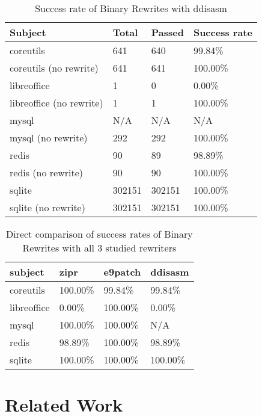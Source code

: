 \documentclass[a4paper,11pt,oneside]{report}
\begin{document}
    \begin{table}[h]
    \centering
    \caption{Success rate of Binary Rewrites with ddisasm}
    \begin{tabular}{|l|l|l|l|}
    \hline
    Subject & Total & Passed & Success rate \\ \hline
    coreutils & 641 & 640 & 99.84\% \\ \hline
    coreutils (no rewrite) & 641 & 641 & 100.00\% \\ \hline
    libreoffice & 1 & 0 & 0.00\% \\ \hline
    libreoffice (no rewrite) & 1 & 1 & 100.00\% \\ \hline
    mysql & N/A & N/A & N/A \\ \hline
    mysql (no rewrite) & 292 & 292 & 100.00\% \\ \hline
    redis & 90 & 89 & 98.89\% \\ \hline
    redis (no rewrite) & 90 & 90 & 100.00\% \\ \hline
    sqlite & 302151 & 302151 & 100.00\% \\ \hline
    sqlite (no rewrite) & 302151 & 302151 & 100.00\% \\ \hline
    \end{tabular}
    \end{table}
    
    \begin{table}[h]
    \centering
    \caption{Direct comparison of success rates of Binary Rewrites with all 3 studied rewriters}
    \begin{tabular}{|l|l|l|l|}
    \hline
    subject & zipr & e9patch & ddisasm \\ \hline
    coreutils & 100.00\% & 99.84\% & 99.84\% \\ \hline
    libreoffice & 0.00\% & 100.00\% & 0.00\% \\ \hline
    mysql & 100.00\% & 100.00\% & N/A \\ \hline
    redis & 98.89\% & 100.00\% & 98.89\% \\ \hline
    sqlite & 100.00\% & 100.00\% & 100.00\% \\ \hline
    \end{tabular}
    \end{table}


\chapter{Related Work}
\end{document}
